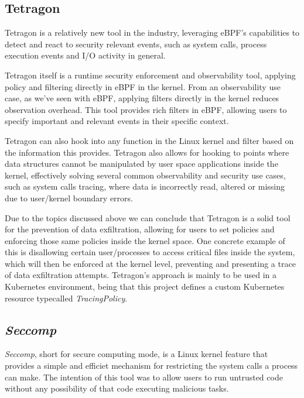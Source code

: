 \subsection{Tetragon}

Tetragon is a relatively new tool in the industry, leveraging eBPF's capabilities to detect and react to security relevant events, such as system calls, process execution events and I/O activity in general. 

Tetragon itself is a runtime security enforcement and observability tool, applying policy and filtering directly in eBPF in the kernel. From an observability use case, as we've seen with eBPF, applying filters directly in the kernel reduces observation overhead. This tool provides rich filters in eBPF, allowing users to specify important and relevant events in their specific context. 

Tetragon can also hook into any function in the Linux kernel and filter based on the information this provides. Tetragon also allows for hooking to points where data structures cannot be manipulated by user space applications inside the kernel, effectively solving several common observability and security use cases, such as system calls tracing, where data is incorrectly read, altered or missing due to user/kernel boundary errors. 

Due to the topics discussed above we can conclude that Tetragon is a solid tool for the prevention of data exfiltration, allowing for users to set policies and enforcing those same policies inside the kernel space. One concrete example of this is disallowing certain user/processes to access critical files inside the system, which will then be enforced at the kernel level, preventing and presenting a trace of data exfiltration attempts. Tetragon's approach is mainly to be used in a Kubernetes environment, being that this project defines a custom Kubernetes resource typecalled \textit{TracingPolicy}. 

\subsection{\textit{Seccomp}}

\textit{Seccomp}, short for secure computing mode, is a Linux kernel feature that provides a simple and efficiet mechanism for restricting the system calls a process can make. The intention of this tool was to allow users to run untrusted code without any possibility of that code executing malicious tasks. 


